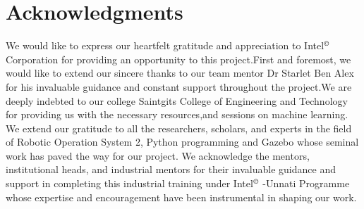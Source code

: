 \documentclass{josis}
\begin{document}
\section*{Acknowledgments}
We would like to express our heartfelt gratitude and appreciation to Intel$^\copyright$ Corporation for providing an opportunity to this project.First and foremost, we would like to extend our sincere thanks to our team mentor Dr Starlet Ben Alex for his invaluable guidance and constant support throughout the project.We are deeply indebted to our college Saintgits College of Engineering and Technology for providing us with the necessary resources,and sessions on machine learning. We extend our gratitude to all the researchers, scholars, and experts in the field of Robotic Operation System 2, Python programming and Gazebo whose seminal work has paved the way for our project. We acknowledge the mentors, institutional heads, and industrial mentors for their invaluable guidance and support in completing this industrial training under Intel$^\copyright$ -Unnati Programme whose expertise and encouragement have been instrumental in shaping our work.
\cite{*}
\end{document}
